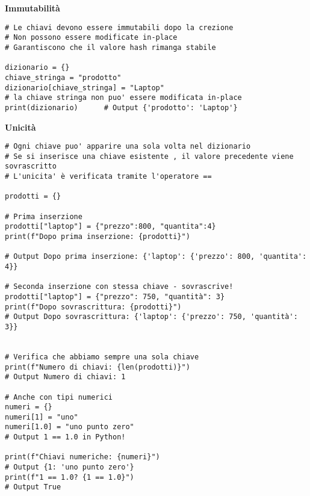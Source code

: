 \vspace{0.5cm}
\textbf{Immutabilità}
\begin{lstlisting}
# Le chiavi devono essere immutabili dopo la crezione
# Non possono essere modificate in-place
# Garantiscono che il valore hash rimanga stabile

dizionario = {}
chiave_stringa = "prodotto"
dizionario[chiave_stringa] = "Laptop"
# la chiave stringa non puo' essere modificata in-place
print(dizionario)      # Output {'prodotto': 'Laptop'}
\end{lstlisting}

\vspace{0.5cm}
\textbf{Unicità}
\begin{lstlisting}
# Ogni chiave puo' apparire una sola volta nel dizionario
# Se si inserisce una chiave esistente , il valore precedente viene sovrascritto
# L'unicita' è verificata tramite l'operatore ==

prodotti = {}

# Prima inserzione
prodotti["laptop"] = {"prezzo":800, "quantita":4}
print(f"Dopo prima inserzione: {prodotti}")

# Output Dopo prima inserzione: {'laptop': {'prezzo': 800, 'quantita': 4}}

# Seconda inserzione con stessa chiave - sovrascrive!
prodotti["laptop"] = {"prezzo": 750, "quantità": 3}
print(f"Dopo sovrascrittura: {prodotti}")
# Output Dopo sovrascrittura: {'laptop': {'prezzo': 750, 'quantità': 3}}


# Verifica che abbiamo sempre una sola chiave
print(f"Numero di chiavi: {len(prodotti)}")  
# Output Numero di chiavi: 1

# Anche con tipi numerici
numeri = {}
numeri[1] = "uno"
numeri[1.0] = "uno punto zero"  
# Output 1 == 1.0 in Python!

print(f"Chiavi numeriche: {numeri}")  
# Output {1: 'uno punto zero'}
print(f"1 == 1.0? {1 == 1.0}")  
# Output True
\end{lstlisting}


